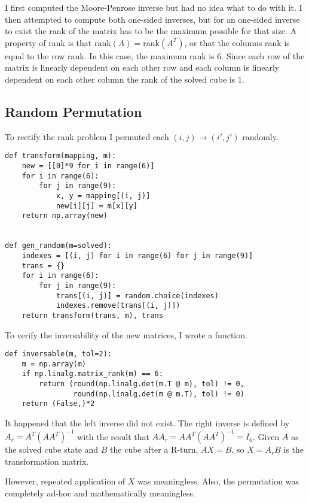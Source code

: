 \documentclass[11pt, oneside]{article}
\begin{document}
I first computed the Moore-Penrose inverse but had no idea what to do with it.
I then attempted to compute both one-sided inverses, but for an one-sided inverse to exist the rank of the matrix has to be the maximum possible for that size.
A property of rank is that \( \text{rank}(A) = \text{rank}(A^T) \), or that the columns rank is equal to the row rank. In this case, the maximum rank is 6.
Since each row of the matrix is linearly dependent on each other row and each column is linearly dependent on each other column the rank of the solved cube is 1.

\subsection{Random Permutation}

To rectify the rank problem I permuted each \( (i, j) \to (i', j') \) randomly.

\begin{verbatim}
def transform(mapping, m):
    new = [[0]*9 for i in range(6)]
    for i in range(6):
        for j in range(9):
            x, y = mapping[(i, j)]
            new[i][j] = m[x][y]
    return np.array(new)


def gen_random(m=solved):
    indexes = [(i, j) for i in range(6) for j in range(9)]
    trans = {}
    for i in range(6):
        for j in range(9):
            trans[(i, j)] = random.choice(indexes)
            indexes.remove(trans[(i, j)])
    return transform(trans, m), trans
\end{verbatim}

To verify the inversability of the new matrices, I wrote a function.

\begin{verbatim}
def inversable(m, tol=2):
    m = np.array(m)
    if np.linalg.matrix_rank(m) == 6:
        return (round(np.linalg.det(m.T @ m), tol) != 0,
                round(np.linalg.det(m @ m.T), tol) != 0)
    return (False,)*2
\end{verbatim}

It happened that the left inverse did not exist.
The right inverse is defined by \( A_r = A^T (A A^T)^{-1} \) with the result that
\( A A_r = A A^T (A A^T)^{-1} = I_6 \).
Given \( A \) as the solved cube state and \( B \) the cube after a R-turn,
\( A X = B \), so \( X = A_r B \) is the transformation matrix.

However, repeated application of \( X \) was meaningless. Also, the permutation
was completely ad-hoc and mathematically meaningless.
\end{document}
